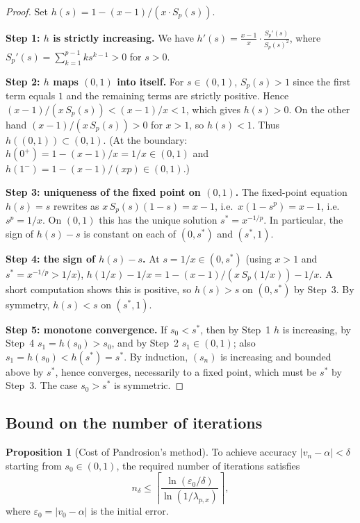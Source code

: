 \documentclass[11pt,a4paper]{article}
\theoremstyle{definition}
\newtheorem{proposition}{Proposition}[section]
\newcommand{\eps}{\varepsilon}
\begin{document}
\begin{proof}
Set $h(s) = 1 - (x-1)/(x \cdot S_p(s))$.

\textbf{Step 1: $h$ is strictly increasing.}
We have $h'(s) = \frac{x-1}{x} \cdot \frac{S_p'(s)}{S_p(s)^2}$, where $S_p'(s) = \sum_{k=1}^{p-1} k s^{k-1} > 0$ for $s > 0$.

\textbf{Step 2: $h$ maps $(0,1)$ into itself.}
For $s \in (0,1)$, $S_p(s) > 1$ since the first term equals $1$ and the remaining terms are strictly positive. Hence
$(x-1)/(x\,S_p(s)) < (x-1)/x < 1$, which gives $h(s) > 0$. On the other hand $(x-1)/(x\,S_p(s)) > 0$ for $x > 1$, so $h(s) < 1$. Thus $h((0,1)) \subset (0,1)$. (At the boundary: $h(0^+) = 1 - (x-1)/x = 1/x \in (0,1)$ and $h(1^-) = 1 - (x-1)/(xp) \in (0,1)$.)

\textbf{Step 3: uniqueness of the fixed point on $(0,1)$.}
The fixed-point equation $h(s) = s$ rewrites as $x\,S_p(s)(1-s) = x - 1$, i.e.\ $x(1 - s^p) = x - 1$, i.e.\ $s^p = 1/x$. On $(0,1)$ this has the unique solution $s^* = x^{-1/p}$. In particular, the sign of $h(s) - s$ is constant on each of $(0, s^*)$ and $(s^*, 1)$.

\textbf{Step 4: the sign of $h(s) - s$.}
At $s = 1/x \in (0, s^*)$ (using $x > 1$ and $s^* = x^{-1/p} > 1/x$), $h(1/x) - 1/x = 1 - (x-1)/(x\,S_p(1/x)) - 1/x$. A short computation shows this is positive, so $h(s) > s$ on $(0, s^*)$ by Step~3. By symmetry, $h(s) < s$ on $(s^*, 1)$.

\textbf{Step 5: monotone convergence.}
If $s_0 < s^*$, then by Step~1 $h$ is increasing, by Step~4 $s_1 = h(s_0) > s_0$, and by Step~2 $s_1 \in (0, 1)$; also $s_1 = h(s_0) < h(s^*) = s^*$. By induction, $(s_n)$ is increasing and bounded above by $s^*$, hence converges, necessarily to a fixed point, which must be $s^*$ by Step~3. The case $s_0 > s^*$ is symmetric.
\end{proof}

\subsection{Bound on the number of iterations}

\begin{proposition}[Cost of Pandrosion's method]
\label{prop:cout}
To achieve accuracy $|v_n - \alpha| < \delta$ starting from $s_0 \in (0,1)$, the required number of iterations satisfies
\[
  n_\delta \leq \left\lceil \frac{\ln(\eps_0 / \delta)}{\ln(1/\lambda_{p,x})} \right\rceil,
\]
where $\eps_0 = |v_0 - \alpha|$ is the initial error.
\end{proposition}
\end{document}
